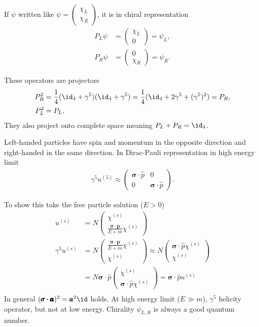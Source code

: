 If $\psi$ written like $\psi = \begin{pmatrix} \chi_L \\ \chi_R \end{pmatrix}$, it is in chiral representation
\begin{align*}
   P_L \psi &= \begin{pmatrix} \chi_L \\ 0\end{pmatrix} = \psi_L, \\
   P_R \psi &= \begin{pmatrix} 0 \\ \chi_R \end{pmatrix} = \psi_R.
\end{align*}

These operators are projectors
\begin{align*}
   P_R^2 &= \frac{1}{4} (\id_4 + \gamma^5) (\id_4 + \gamma^5) = \frac{1}{4} (\id_4 + 2 \gamma^5 + (\gamma^5)^2) = P_R, \\
   P_L^2 &= P_L.
\end{align*}
They also project onto complete space meaning $P_L + P_R = \id_4$.

Left-handed particles have spin and momentum in the opposite direction and right-handed in the same direction. In Dirac-Pauli representation in high energy limit
\begin{align*}
   \gamma^5 u^{(5)} \approx \begin{pmatrix} \pmb{\sigma} \cdot \hat{p} & 0 \\ 0 & \pmb{\sigma} \cdot \hat{p}\end{pmatrix}.
\end{align*}

To show this take the free particle solution ($E>0$)
\begin{align*}
   u^{(s)} &= N \begin{pmatrix} \chi^{(s)} \\ \frac{\pmb{\sigma \cdot \pmb{p}}}{E+m} \chi^{(s)}\end{pmatrix} \\
   \gamma^5 u^{(s)} &= N  \begin{pmatrix}  \frac{\pmb{\sigma \cdot \pmb{p}}}{E+m} \chi^{(s)} \\ \chi^{(s)}  \end{pmatrix} \approx N \begin{pmatrix} \pmb{\sigma} \cdot \hat{p} \chi^{(s)} \\ \chi^{(s)} \end{pmatrix} \\
   &=  N \pmb{\sigma} \cdot \hat{p} \begin{pmatrix} \chi^{(s)} \\ \pmb{\sigma} \cdot \hat{p} \chi^{(s)} \end{pmatrix}  = {\pmb{\sigma} \cdot \hat{p}} u^{(s)} \\
\end{align*}
In general $(\pmb{\sigma \cdot \pmb{a}})^2 = \pmb{a}^2 \id$ holds.
At high energy limit ($E \gg m$), $\gamma^5$ helicity operator, but not at low energy. Chirality $\psi_{L,R}$ is always a good quantum number.

